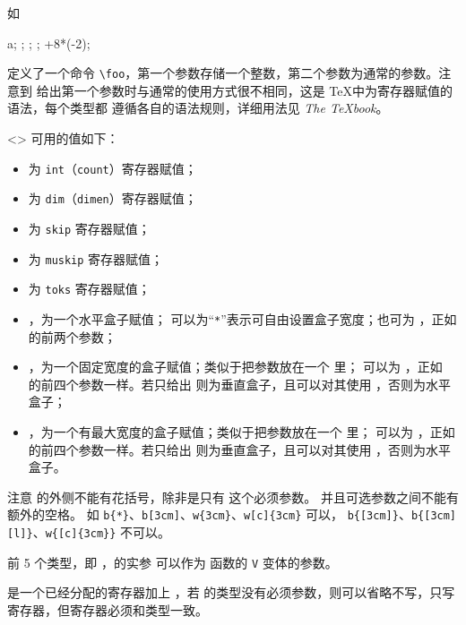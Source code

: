 \documentclass{cusdoc}
\begin{document}
如
\begin{xample}
\ekeysdeclarecmd{}
\ttfamily
{} {a}; \quad {} \relax; \quad {}\relax;
\foo {}\relax; \foo {}+8*(-2)\relax;
\stopxamplecode
\xampleprint
\end{xample}
定义了一个命令 \verb|\foo|，第一个参数存储一个整数，第二个参数为通常的参数。注意到
给出第一个参数时与通常的使用方式很不相同，这是 \TeX 中为寄存器赋值的语法，每个类型都
遵循各自的语法规则，详细用法见 \textit{The \TeX book}。

\startfullpagewidth<\bodylmargin>
 可用的值如下：
\begin{itemize}
  \item[\texttt i] 为 \texttt{int}（\texttt{count}）寄存器赋值；
  \item[\texttt d] 为 \texttt{dim}（\texttt{dimen}）寄存器赋值；
  \item[\texttt s] 为 \texttt{skip} 寄存器赋值；
  \item[\texttt m] 为 \texttt{muskip} 寄存器赋值；
  \item[\texttt t] 为 \texttt{toks} 寄存器赋值；
  \item[\texttt b]，为一个水平盒子赋值； 可以为“\texttt{*}”表示可自由设置盒子宽度；也可为 ，正如  的前两个参数；
  \item[\texttt w]，为一个固定宽度的盒子赋值；类似于把参数放在一个 里； 可以为 ，正如  的前四个参数一样。若只给出  则为垂直盒子，且可以对其使用 ，否则为水平盒子；
  \item[\texttt v]，为一个有最大宽度的盒子赋值；类似于把参数放在一个  里； 可以为 ，正如  的前四个参数一样。若只给出  则为垂直盒子，且可以对其使用 ，否则为水平盒子。
\end{itemize}
注意  的外侧不能有花括号，除非是只有  这个必须参数。
并且可选参数之间不能有额外的空格。
如 \verb|b{*}|、\verb|b[3cm]|、\verb|w{3cm}|、\verb|w[c]{3cm}| 可以，
\verb|b{[3cm]}|、\verb|b{[3cm][l]}|、\verb|w{[c]{3cm}}| 不可以。

前 5 个类型，即 ，的实参
可以作为 \LaTeXiii 函数的 \texttt{V} 变体的参数。

 是一个已经分配的寄存器加上 ，若 
 的类型没有必须参数，则可以省略不写，只写寄存器，但寄存器必须和类型一致。
\end{document}
